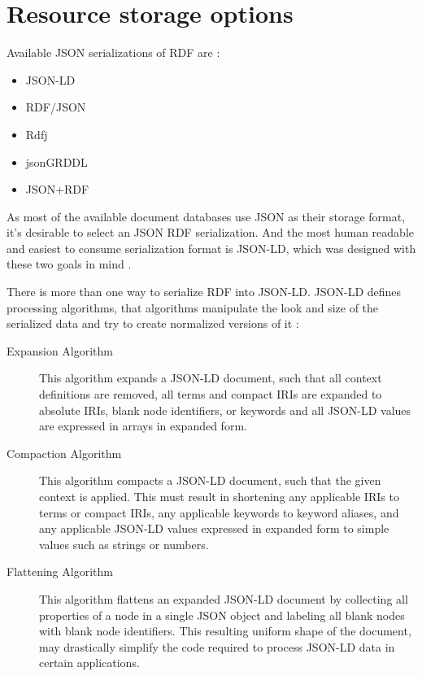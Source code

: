 \section{Resource storage options}
Available JSON serializations of RDF are \cite{onlineW3CRdfSyntax}:
\begin{itemize}
	\item JSON-LD
	\item RDF/JSON
	\item Rdfj
	\item jsonGRDDL
	\item JSON+RDF
\end{itemize}
As most of the available document databases use JSON as their storage format, it's desirable to select an JSON RDF serialization. And the most human readable and easiest to consume serialization format is JSON-LD, which was designed with these two goals in mind \cite{onlineJsonLdDesignGoals}. 

There is more than one way to serialize RDF into JSON-LD. JSON-LD defines processing algorithms, that algorithms manipulate the look and size of the serialized data and try to create normalized versions of it \cite{onlineW3CJsonLdAlgorithmsSpec}:
\begin{description}
	\item[Expansion Algorithm] This algorithm expands a JSON-LD document, such that all context definitions are removed, all terms and compact IRIs are expanded to absolute IRIs, blank node identifiers, or keywords and all JSON-LD values are expressed in arrays in expanded form.
	\item[Compaction Algorithm] This algorithm compacts a JSON-LD document, such that the given context is applied. This must result in shortening any applicable IRIs to terms or compact IRIs, any applicable keywords to keyword aliases, and any applicable JSON-LD values expressed in expanded form to simple values such as strings or numbers.
	\item[Flattening Algorithm] This algorithm flattens an expanded JSON-LD document by collecting all properties of a node in a single JSON object and labeling all blank nodes with blank node identifiers. This resulting uniform shape of the document, may drastically simplify the code required to process JSON-LD data in certain applications.
\end{description}

